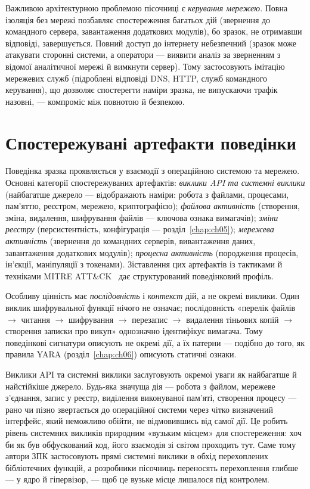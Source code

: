 Важливою архітектурною проблемою пісочниці є \emph{керування мережею}. Повна ізоляція без мережі позбавляє спостереження багатьох дій (звернення до командного сервера, завантаження додаткових модулів), бо зразок, не отримавши відповіді, завершується. Повний доступ до інтернету небезпечний (зразок може атакувати сторонні системи, а оператори --- виявити аналіз за зверненням з відомої аналітичної мережі й вимкнути сервер). Тому застосовують імітацію мережевих служб (підроблені відповіді DNS, HTTP, служб командного керування), що дозволяє спостерегти наміри зразка, не випускаючи трафік назовні, --- компроміс між повнотою й безпекою.

\section{Спостережувані артефакти поведінки}\label{sec:ch07-artifacts}

Поведінка зразка проявляється у взаємодії з операційною системою та мережею. Основні категорії спостережуваних артефактів: \emph{виклики API та системні виклики} (найбагатше джерело --- відображають наміри: робота з файлами, процесами, пам'яттю, реєстром, мережею, криптографією); \emph{файлова активність} (створення, зміна, видалення, шифрування файлів --- ключова ознака вимагачів); \emph{зміни реєстру} (персистентність, конфігурація --- розділ~\ref{chap:ch05}); \emph{мережева активність} (звернення до командних серверів, вивантаження даних, завантаження додаткових модулів); \emph{процесна активність} (породження процесів, ін'єкції, маніпуляції з токенами). Зіставлення цих артефактів із тактиками й техніками MITRE ATT\&CK~\cite{mitre-attack} дає структурований поведінковий профіль.

Особливу цінність має \emph{послідовність} і \emph{контекст} дій, а не окремі виклики. Один виклик шифрувальної функції нічого не означає; послідовність «перелік файлів $\to$ читання $\to$ шифрування $\to$ перезапис $\to$ видалення тіньових копій $\to$ створення записки про викуп» однозначно ідентифікує вимагача. Тому поведінкові сигнатури описують не окремі дії, а їх патерни --- подібно до того, як правила YARA (розділ~\ref{chap:ch06}) описують статичні ознаки.

Виклики API та системні виклики заслуговують окремої уваги як найбагатше й найстійкіше джерело. Будь-яка значуща дія --- робота з файлом, мережеве з'єднання, запис у реєстр, виділення виконуваної пам'яті, створення процесу --- рано чи пізно звертається до операційної системи через чітко визначений інтерфейс, який неможливо обійти, не відмовившись від самої дії. Це робить рівень системних викликів природним «вузьким місцем» для спостереження: хоч би як був обфускований код, його взаємодія зі світом проходить тут. Саме тому автори ЗПК застосовують прямі системні виклики в обхід перехоплених бібліотечних функцій, а розробники пісочниць переносять перехоплення глибше --- у ядро й гіпервізор, --- щоб це вузьке місце лишалося під контролем.

